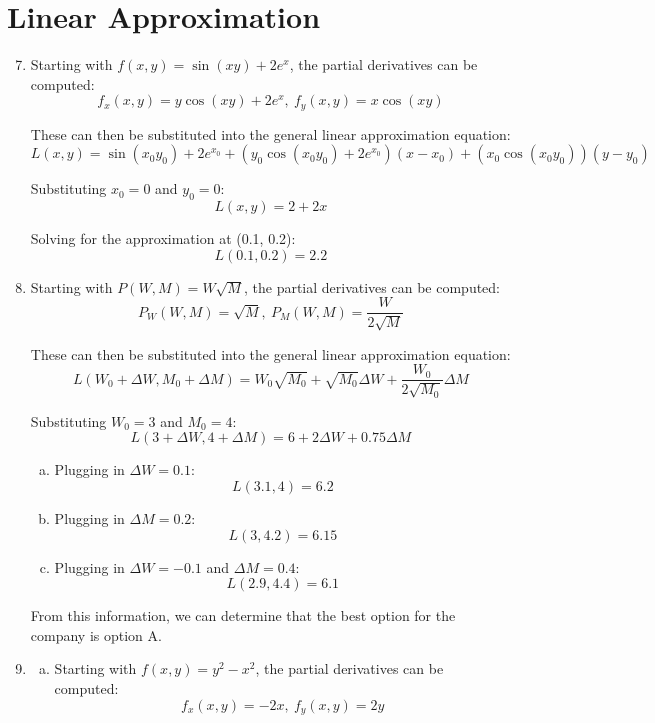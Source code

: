 \documentclass{article}
\begin{document}
\section{Linear Approximation}

\begin{enumerate}[1.]
  \setcounter{enumi}{6}
  \item Starting with $f(x, y) = \sin(xy) + 2e^{x}$, the partial derivatives can
    be computed:
    $$ f_{x}(x,y) = y \cos(xy) + 2e^{x}, \ f_{y}(x,y) = x \cos(xy) $$

    These can then be substituted into the general linear approximation
    equation:
    $$ L(x,y) = \sin(x_{0}y_{0}) + 2e^{x_{0}} + (y_{0} \cos(x_{0}y_{0}) +
    2e^{x_{0}})(x - x_{0}) + (x_{0} \cos(x_{0}y_{0}))(y - y_{0}) $$

    Substituting $x_{0}=0$ and $y_{0}=0$:
    $$ L(x,y) = 2 + 2x $$

    Solving for the approximation at (0.1, 0.2):
    $$ L(0.1, 0.2) = 2.2 $$

  \item Starting with $P(W, M) = W \sqrt{M}$, the partial derivatives can be
    computed:
    $$ P_{W}(W, M) = \sqrt{M}, \ P_{M}(W, M) = \frac{ W }{ 2 \sqrt{M} } $$

    These can then be substituted into the general linear approximation
    equation:
    $$ L(W_{0} + \Delta W, M_{0} + \Delta M) = W_{0} \sqrt{M_{0}} + \sqrt{M_{0}}
    \Delta W + \frac{ W_{0} }{ 2 \sqrt{M_{0}}} \Delta M $$

    Substituting $W_{0} = 3$ and $M_{0} = 4$:
    $$ L(3 + \Delta W, 4 + \Delta M) = 6 + 2 \Delta W + 0.75 \Delta M $$

    \bigbreak

    \begin{enumerate}[a.]
      \item Plugging in $\Delta W = 0.1$:
        $$ L(3.1, 4) = 6.2 $$

      \item Plugging in $\Delta M = 0.2$:
        $$ L(3, 4.2) = 6.15 $$

      \item Plugging in $\Delta W = -0.1$ and $\Delta M = 0.4$:
        $$ L(2.9, 4.4) = 6.1 $$
    \end{enumerate}

    \bigbreak

    From this information, we can determine that the best option for the company
    is option A.
  \item \begin{enumerate}[a.]
    \item Starting with $f(x,y) = y^{2} - x^{2}$, the partial derivatives can be
      computed:
      $$ f_{x}(x, y) = -2x, \ f_{y}(x, y) = 2y $$


\end{enumerate}
\end{enumerate}
\end{document}
